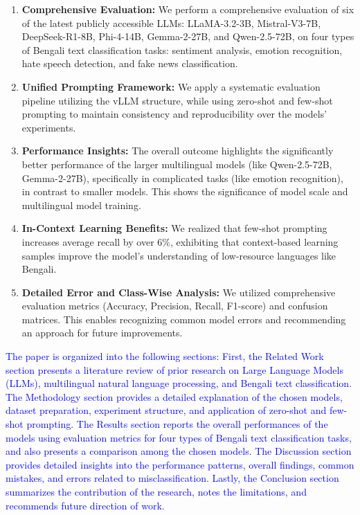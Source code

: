 \documentclass[10pt,letterpaper]{article}
\newcommand{\rev}[1]{\textcolor{blue}{#1}}
\begin{document}
\begin{enumerate}
    \item \textbf{Comprehensive Evaluation:} We perform a comprehensive evaluation of six of the latest publicly accessible LLMs: LLaMA-3.2-3B, Mistral-V3-7B, DeepSeek-R1-8B, Phi-4-14B, Gemma-2-27B, and Qwen-2.5-72B, on four types of Bengali text classification tasks: sentiment analysis, emotion recognition, hate speech detection, and fake news classification.
    
    \item \textbf{Unified Prompting Framework:} We apply a systematic evaluation pipeline utilizing the vLLM structure, while using zero-shot and few-shot prompting to maintain consistency and reproducibility over the models' experiments.
    
    \item \textbf{Performance Insights:} The overall outcome highlights the significantly better performance of the larger multilingual models (like Qwen-2.5-72B, Gemma-2-27B), specifically in complicated tasks (like emotion recognition), in contrast to smaller models. This shows the significance of model scale and multilingual model training.
    
    \item \textbf{In-Context Learning Benefits:} We realized that few-shot prompting increases average recall by over 6\%, exhibiting that context-based learning samples improve the model's understanding of low-resource languages like Bengali.
    
    \item \textbf{Detailed Error and Class-Wise Analysis:} We utilized comprehensive evaluation metrics (Accuracy, Precision, Recall, F1-score) and confusion matrices. This enables recognizing common model errors and recommending an approach for future improvements.

\end{enumerate}

\rev{The paper is organized into the following sections: First, the Related Work section presents a literature review of prior research on Large Language Models (LLMs), multilingual natural language processing, and Bengali text classification. The Methodology section provides a detailed explanation of the chosen models, dataset preparation, experiment structure, and application of zero-shot and few-shot prompting. The Results section reports the overall performances of the models using evaluation metrics for four types of Bengali text classification tasks, and also presents a comparison among the chosen models. The Discussion section provides detailed insights into the performance patterns, overall findings, common mistakes, and errors related to misclassification. Lastly, the Conclusion section summarizes the contribution of the research, notes the limitations, and recommends future direction of work.}
\end{document}

